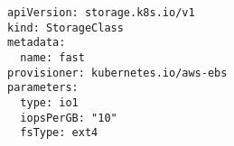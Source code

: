 \begin{verbatim}
apiVersion: storage.k8s.io/v1
kind: StorageClass
metadata:
  name: fast
provisioner: kubernetes.io/aws-ebs
parameters:
  type: io1
  iopsPerGB: "10"
  fsType: ext4
\end{verbatim}
